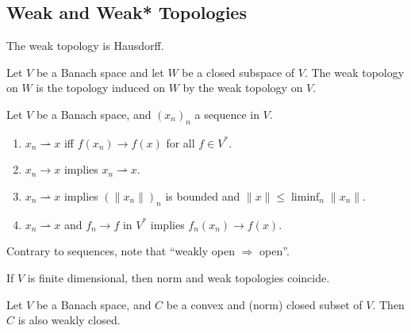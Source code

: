 \documentclass[12pt]{article}	%
\newcommand{\weak}{\rightharpoonup}
\begin{document}
\subsection{Weak and Weak* Topologies}

\begin{prop}
	The weak topology is Hausdorff.
\end{prop}

\begin{prop}
	Let $V$ be a Banach space and let $W$ be a closed subspace of $V$. The weak topology on $W$ is the topology induced on $W$ by the weak topology on $V$.
\end{prop}

\begin{prop}
	Let $V$ be a Banach space, and $(x_{n})_{n}$ a sequence in $V$.
	\begin{enumerate}
		\item $x_{n} \weak x$ iff $f(x_{n}) \to f(x)$ for all $f \in V^{\ast}$.
		\item $x_{n} \to x$ implies $x_{n} \weak x$.
		\item $x_{n} \weak x$ implies $(\|x_{n}\|)_{n}$ is bounded and $\|x\| \le \liminf_{n} \|x_{n}\|$.
		\item $x_{n} \weak x$ and $f_{n} \to f$ in $V^{\ast}$ implies $f_{n}(x_{n}) \to f(x)$.
	\end{enumerate}
\end{prop}

\begin{rem}
	Contrary to sequences, note that ``weakly open $\Rightarrow$ open''.
\end{rem}

\begin{prop}
	If $V$ is finite dimensional, then norm and weak topologies coincide.
\end{prop}

\begin{prop}
	Let $V$ be a Banach space, and $C$ be a convex and (norm) closed subset of $V$. Then $C$ is also weakly closed.
\end{prop}
\end{document}
